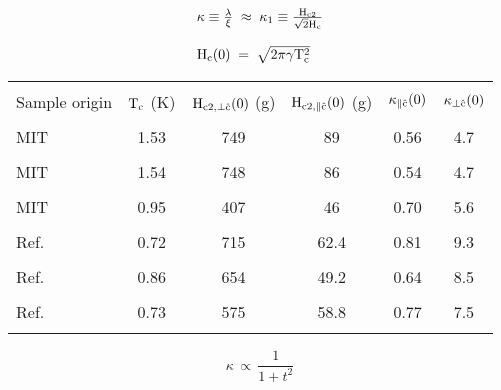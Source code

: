 {\newpage
\clearpage
\samepage \begin{figure}\vspace{10cm} %

\label{Khc2theta}
\end{figure}
}

{\newpage
\clearpage
\samepage \begin{equation}\begin{array}{l}
\rm \kappa \equiv \frac{\lambda}{\xi} \; \approx \; \kappa_1 \equiv
\frac{H_{c2}}{\sqrt{2}H_{c}} \\ 
\\ 
\rm H_{c}(0) \; = \; \sqrt{2 \pi \gamma T_c^2}
\end{array}
\label{kappadef}
\end{equation}
}

{\newpage
\clearpage
\samepage \begin{table}
\label{kappatable}
\begin{center}
\begin{tabular}{|l|ccccc|}
\hline
& & & & & \\ 
Sample origin & $\rm T_c$ (K) & $\rm H_{c2,\perp\hat{c}}(0)$ (g) & $\rm H_{c2,\parallel\hat{c}}(0)$ (g) & $\rm \kappa_{\parallel\hat{c}}(0)$ & $\rm \kappa_{\perp\hat{c}}(0)$\\ 
& & & & & \\ 
\hline
MIT & 1.53 & 749 & 89 & 0.56 & 4.7\\ 
& & & & & \\ 
MIT & 1.54 & 748 & 86 & 0.54 & 4.7\\ 
& & & & & \\ 
MIT & 0.95 & 407 & 46 & 0.70 & 5.6\\ 
& & & & & \\ 
Ref.~\cite{iye82} & 0.72 & 715 & 62.4 & 0.81 & 9.3\\ 
& & & & & \\ 
Ref.~\cite{iye82} & 0.86 & 654 & 49.2 & 0.64 & 8.5\\ 
& & & & & \\ 
Ref.~\cite{iye82} & 0.73 & 575 & 58.8 & 0.77 & 7.5\\ 
& & & & & \\ 
\hline
\end{tabular}
\end{center}

\end{table}
}

{\newpage
\clearpage
\samepage \begin{displaymath}\kappa \, \propto \, \frac{1}{1 + t^2}
\end{displaymath}
}

